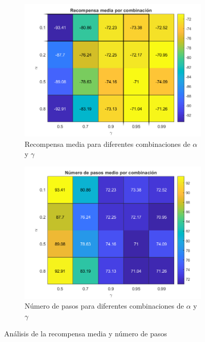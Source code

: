 \begin{figure}[H]
    \centering
    \begin{subfigure}{0.7\textwidth}
        \centering
        \includegraphics[width=\textwidth]{../../experiments/qlearning/experiment-1/results/reward.png}
        \caption{Recompensa media para diferentes combinaciones de $\alpha$ y $\gamma$}
        \label{fig:qlearning-subfig-reward}
    \end{subfigure}
    \hfill
    \begin{subfigure}{0.7\textwidth}
        \centering
        \includegraphics[width=\textwidth]{../../experiments/qlearning/experiment-1/results/steps.png}
        \caption{Número de pasos para diferentes combinaciones de $\alpha$ y $\gamma$}
        \label{fig:qlearning-subfig-steps}
    \end{subfigure}
    \caption{Análisis de la recompensa media y número de pasos}
    \label{fig:qlearning-reward}
\end{figure}

